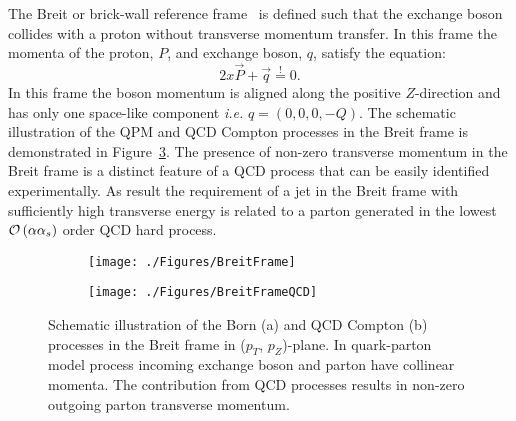 The Breit or brick-wall reference frame~\cite{feynman:1972:photon,zfp:c2:237} is defined such that the exchange boson collides with a proton without transverse momentum transfer. In this frame the momenta of the proton, $P$, and exchange boson, $q$, satisfy the equation:
\begin{equation}
2x\vec{P} + \vec{q} \stackrel{!}{=} 0.
\label{eq:breitframe}
\end{equation}
In this frame the boson momentum is aligned along the positive $Z$-direction and has only one space-like component \textit{i.e.} $q=\left( 0, 0, 0, -Q\right)$. The schematic illustration of the QPM and QCD Compton processes in the Breit frame is demonstrated in Figure~\ref{fig:breitframe}. The presence of non-zero transverse momentum in the Breit frame is a distinct feature of a QCD process that can be easily identified experimentally. As result the requirement of a jet in the Breit frame with sufficiently high transverse energy is related to a parton generated in the lowest $\mathcal{O}\left(\alpha\mbox{$\alpha_{s}$}\right)$ order QCD hard process.
\begin{figure}
	\centering
	\begin{subfigure}{.49\textwidth}
		\centering
		\texttt{[image: ./Figures/BreitFrame]}
		\caption{}
		\label{fig:breitframeqpm}
	\end{subfigure}
	\begin{subfigure}{.49\textwidth}
		\texttt{[image: ./Figures/BreitFrameQCD]}
		\caption{}
		\label{fig:breitframeqcd}
	\end{subfigure}
	\caption{Schematic illustration of the Born (a) and QCD Compton (b) processes in the Breit frame in ($p_T$, $p_Z$)-plane. In quark-parton model process incoming exchange boson and parton have collinear momenta. The contribution from QCD processes results in non-zero outgoing parton transverse momentum.}
\label{fig:breitframe}
\end{figure}